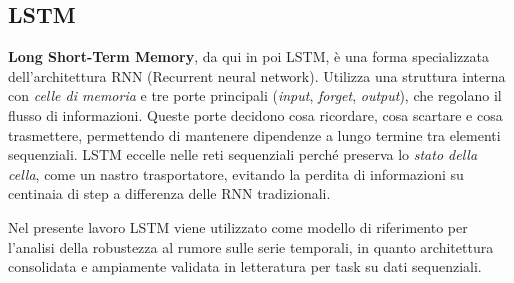 \documentclass[../main.tex]{subfiles}
\begin{document}
\subsection{LSTM}
\textbf{Long Short-Term Memory}, da qui in poi LSTM, è una forma specializzata dell'architettura RNN (Recurrent neural network). Utilizza una struttura interna con \textit{celle di memoria} e tre porte principali (\textit{input}, \textit{forget}, \textit{output}), che regolano il flusso di informazioni. Queste porte decidono cosa ricordare, cosa scartare e cosa trasmettere, permettendo di mantenere dipendenze a lungo termine tra elementi sequenziali. LSTM eccelle nelle reti sequenziali perché preserva lo \textit{stato della cella}, come un nastro trasportatore, evitando la perdita di informazioni su centinaia di step a differenza delle RNN tradizionali.\cite{ALSELWI2024102068}

Nel presente lavoro LSTM viene utilizzato come modello di riferimento per l'analisi della robustezza al rumore sulle serie temporali, in quanto architettura consolidata e ampiamente validata in letteratura per task su dati sequenziali.
\end{document}
